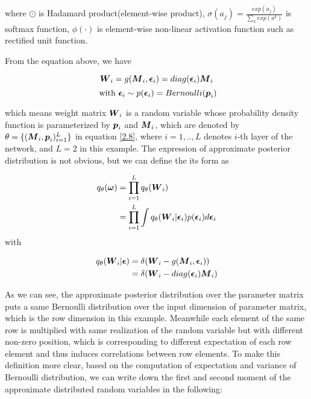 where $\odot$ is Hadamard product(element-wise product), $\sigma(a_{j}) = \frac{exp({a_{j}})}{\sum_{k}exp({a^{k}})}$ is softmax function, $\phi(\cdot)$ is element-wise non-linear activation function such as rectified unit function.
  
From the equation above, we have 

\[
\boldsymbol W_{i} = g(\boldsymbol M_{i}, \boldsymbol \epsilon_{i})= diag(\boldsymbol \epsilon_{i}) \boldsymbol M_{i} 
\]
\[ 
\text{ with } \boldsymbol \epsilon_{i} \sim p(\boldsymbol \epsilon_{i}) = Bernoulli(\boldsymbol p_{i}) 
\]

which means weight matrix $\boldsymbol W_{i}$ is a random variable whose probability density function is parameterized by $\boldsymbol p_{i}$ and $\boldsymbol M_{i}$, which are denoted by $\theta = \{ (\boldsymbol M_{i}, \boldsymbol p_{i})_{i=1}^{L} \}$ in equation \ref{2.8}, where $i = {1,..,L}$ denotes $i$-th layer of the network, and $L = 2$ in this example. 
The expression of approximate posterior distribution is not obvious, but we can define the its form as 

\begin{equation}
\begin{aligned} \label{appro_dist_form}
q_{\theta}(\boldsymbol \omega) &= \prod_{i=1}^{L} q_{\theta}(\boldsymbol W_{i})\\
&= \prod_{i=1}^{L}\int q_{\theta}(\boldsymbol W_{i} | \boldsymbol \epsilon_{i})p(\boldsymbol \epsilon_{i}) d\boldsymbol \epsilon_{i} 
\end{aligned}
\end{equation}
with

\begin{equation}
\begin{aligned} \label{appro_cond_dist_form}
q_{\theta}(\boldsymbol W_{i}|\boldsymbol \epsilon) &= \delta(\boldsymbol W_{i} - g(\boldsymbol M_{i}, \boldsymbol \epsilon_{i}))  \\
& = \delta(\boldsymbol W_{i} - diag(\boldsymbol \epsilon_{i})\boldsymbol M_{i})
\end{aligned}
\end{equation}

As we can see, the approximate posterior distribution over the parameter matrix puts a same Bernoulli distribution over the input dimension of parameter matrix, which is the row dimension in this example.  Meanwhile each element of the same row is multiplied with same realization of the random variable but with different non-zero position, which is corresponding to different expectation of each row element and thus induces correlations between row elements. To make this definition more clear, based on the computation of expectation and variance of Bernoulli distribution, we can write down the first and second moment of the approximate distributed random variables in the following:

